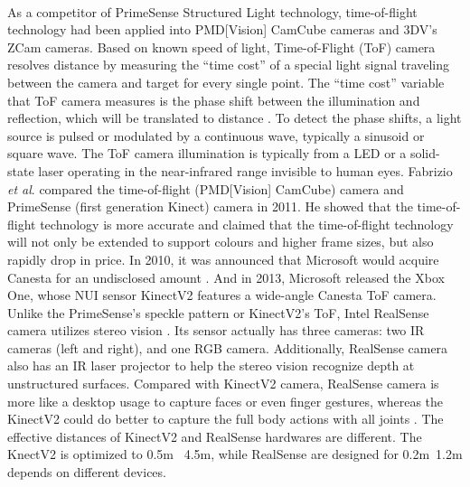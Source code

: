 \\\indent%
As a competitor \cite{evaluationBetween_2015} of PrimeSense Structured Light technology, time-of-flight technology had been applied into PMD[Vision] CamCube cameras and 3DV's ZCam cameras. Based on known speed of light, Time-of-Flight (ToF) camera resolves distance by measuring the \enquote{time cost} of a special light signal traveling between the camera and target for every single point. The \enquote{time cost} variable that ToF camera measures is the phase shift between the illumination and reflection, which will be translated to distance \cite{TimeOfFlight}. To detect the phase shifts, a light source is pulsed or modulated by a continuous wave, typically a sinusoid or square wave. The ToF camera illumination is typically from a LED or a solid-state laser operating in the near-infrared range invisible to human eyes. Fabrizio \textit{et al}. \cite{depthTechCompare_2011} compared the time-of-flight (PMD[Vision] CamCube) camera and PrimeSense (first generation Kinect) camera in 2011. He showed that the time-of-flight technology is more accurate and claimed that the time-of-flight technology will not only be extended to support colours and higher frame sizes, but also rapidly drop in price. %
In 2010, it was announced that Microsoft would acquire Canesta for an undisclosed amount \cite{Canesta_2010}. %
And in 2013,  Microsoft released the Xbox One, whose NUI sensor KinectV2 features a wide-angle Canesta ToF camera.
\\\indent
Unlike the PrimeSense's speckle pattern or KinectV2's ToF, Intel RealSense camera utilizes stereo vision \cite{RealSense01_2015}. Its sensor actually has three cameras: two IR cameras (left and right), and one RGB camera. Additionally, RealSense camera also has an IR laser projector to help the stereo vision recognize depth at unstructured surfaces. Compared with KinectV2 camera, RealSense camera is more like a desktop usage to capture faces or even finger gestures, whereas the KinectV2 could do better to capture the full body actions with all joints \cite{RealSense02_2016}. The effective distances of KinectV2 and RealSense hardwares are different. The KnectV2 is optimized to 0.5m ~4.5m, while RealSense are designed for 0.2m~1.2m depends on different devices.

